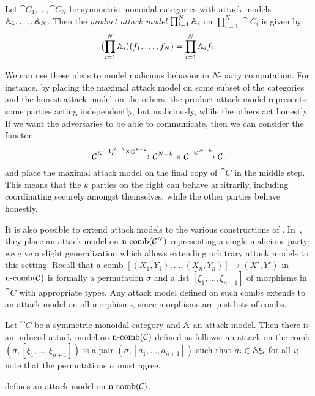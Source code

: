 \begin{dfn}
  Let $\cat{C}_1,\dots,\cat{C}_N$ be symmetric monoidal categories with attack
  models $\AA_1,\dots,\AA_N$. Then the \emph{product attack model}
  $\prod_{i=1}^N \AA_i$ on $\prod_{i=1}^N \cat{C}_i$ is given by \[
    (\prod_{i=1}^N \AA_i)(f_1,\dots, f_N) = \prod_{i=1}^N \AA_i f_i.
  \]
\end{dfn}

We can use these ideas to model malicious behavior in $N$-party
computation. For instance, by placing the maximal attack model on some subset of
the categories and the honest attack model on the others, the product attack
model represents some parties acting independently, but maliciously, while the
others act honestly. If we want the adversaries to be able to communicate, then
we can consider the functor \[
  \cat{C}^N\xto{1_\cat{C}^{N-k}\times\otimes^{k-2}}\cat{C}^{N-k}\times\cat{C}\xto{\otimes^{N-k}}\cat{C},
\]and place the maximal attack model on the final copy of $\cat{C}$ in the
middle step. This means that the $k$ parties on the right can behave
arbitrarily, including coordinating securely amongst themselves, while the other
parties behave honestly.

It is also possible to extend attack models to the various constructions of
.
In~\cite{broadbent-karvonen-2022}, they place an attack model on
$\ncomb{\cat{C}^N}$ representing a single malicious party; we give a slight
generalization which allows extending arbitrary attack models to this setting.
Recall that a comb $[(X_1, Y_1), \dots, (X_n, Y_n)]\to (X', Y')$ in
$\ncomb{\cat{C}}$ is formally a permutation $\sigma$ and a list $[\xi_1, \dots,
\xi_{n+1}]$ of morphisms in $\cat{C}$ with appropriate types. Any attack model
defined on such combs extends to an attack model on all morphisms, since
morphisms are just lists of combs.

\begin{dfn}\label{def:n-comb-attack}
  Let $\cat{C}$ be a symmetric monoidal category and $\AA$ an attack model. Then
  there is an induced attack model on $\ncomb{\cat{C}}$ defined as follows: an
  attack on the comb $(\sigma, [\xi_1, \dots, \xi_{n+1}])$ is a pair
  $(\sigma, [a_1, \dots, a_{n+1}])$ such that $a_i\in\AA \xi_i$ for all
  $i$; note that the permutations $\sigma$ must agree.
\end{dfn}

\begin{prop}
   defines an attack model on
  $\ncomb{\cat{C}}$.
\end{prop}


